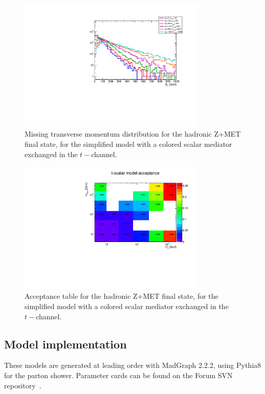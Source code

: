 \begin{figure}[h!]
	\centering  
	\includegraphics[width=0.8\textwidth]{figures/EW/monoZhad_TChannel/metPt}
	\caption{Missing transverse momentum distribution for the hadronic Z+MET final state,
		for the simplified model with a colored scalar mediator exchanged in the $t-$channel.}
	\label{fig:TChan_EW_Zhad_MET}
\end{figure}

\begin{figure}[h!]
	\centering  
	\includegraphics[width=0.8\textwidth]{figures/EW/monoZhad_TChannel/acc}
	\caption{Acceptance table for the hadronic Z+MET final state,
		for the simplified model with a colored scalar mediator exchanged in the $t-$channel.}
	\label{fig:TChan_EW_Zhad_acc}
\end{figure}

\subsection{Model implementation}

These models are generated at leading
order with MadGraph 2.2.2, using Pythia8 for the parton shower.
Parameter cards can be found on the Forum SVN repository~\cite{TODO}.
